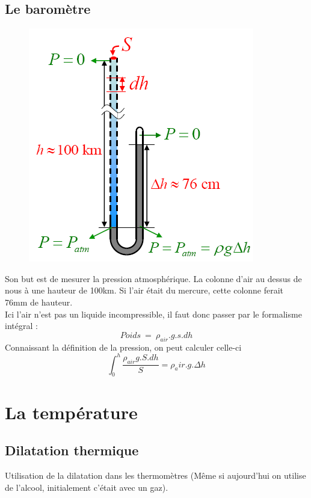 \documentclass	[11pt, a4paper, openany]{book}
\begin{document}
\subsection{Le baromètre}
\begin{figure}
\includegraphics[scale=0.3]{th/image2.png}
\end{figure}
Son but est de mesurer la pression atmosphérique. La colonne d'air au dessus de nous à une hauteur de 100km. Si l'air était du mercure, cette colonne ferait 76mm de hauteur. \\

Ici l'air n'est pas un liquide incompressible, il faut donc passer par le formalisme intégral : 
\begin{equation}
Poids\ =\ \rho_{air}.g.s.dh
\end{equation}
Connaissant la définition de la pression, on peut calculer celle-ci
\begin{equation}
\int_0^h \frac{\rho_{air}g.S.dh}{S} = \rho_air.g.\Delta h
\end{equation}

\section{La température}
\subsection{Dilatation thermique}
Utilisation de la dilatation dans les thermomètres (Même si aujourd'hui on utilise de l'alcool, initialement c'était avec un gaz).
\end{document}
